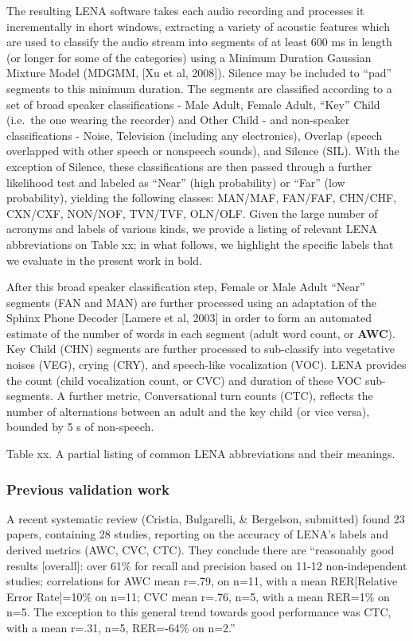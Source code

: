 \documentclass[english,floatsintext,man]{apa6}
\begin{document}
The resulting LENA software takes each audio recording and processes it
incrementally in short windows, extracting a variety of acoustic
features which are used to classify the audio stream into segments of at
least 600 ms in length (or longer for some of the categories) using a
Minimum Duration Gaussian Mixture Model (MDGMM, {[}Xu et al, 2008{]}).
Silence may be included to \enquote{pad} segments to this minimum
duration. The segments are classified according to a set of broad
speaker classifications - Male Adult, Female Adult, \enquote{Key} Child
(i.e.~the one wearing the recorder) and Other Child - and non-speaker
classifications - Noise, Television (including any electronics), Overlap
(speech overlapped with other speech or nonspeech sounds), and Silence
(SIL). With the exception of Silence, these classifications are then
passed through a further likelihood test and labeled as \enquote{Near}
(high probability) or \enquote{Far} (low probability), yielding the
following classes: MAN/MAF, FAN/FAF, CHN/CHF, CXN/CXF, NON/NOF, TVN/TVF,
OLN/OLF. Given the large number of acronyms and labels of various kinds,
we provide a listing of relevant LENA abbreviations on Table xx; in what
follows, we highlight the specific labels that we evaluate in the
present work in bold.

After this broad speaker classification step, Female or Male Adult
\enquote{Near} segments (FAN and MAN) are further processed using an
adaptation of the Sphinx Phone Decoder {[}Lamere et al, 2003{]} in order
to form an automated estimate of the number of words in each segment
(adult word count, or \textbf{AWC}). Key Child (CHN) segments are
further processed to sub-classify into vegetative noises (VEG), crying
(CRY), and speech-like vocalization (VOC). LENA provides the count
(child vocalization count, or CVC) and duration of these VOC
sub-segments. A further metric, Conversational turn counts (CTC),
reflects the number of alternations between an adult and the key child
(or vice versa), bounded by 5 s of non-speech.

Table xx. A partial listing of common LENA abbreviations and their
meanings.

\subsubsection{Previous validation work}\label{previous-validation-work}

A recent systematic review (Cristia, Bulgarelli, \& Bergelson,
submitted) found 23 papers, containing 28 studies, reporting on the
accuracy of LENA's labels and derived metrics (AWC, CVC, CTC). They
conclude there are \enquote{reasonably good results {[}overall{]}: over
61\% for recall and precision based on 11-12 non-independent studies;
correlations for AWC mean r=.79, on n=11, with a mean RER{[}Relative
Error Rate{]}=10\% on n=11; CVC mean r=.76, n=5, with a mean RER=1\% on
n=5. The exception to this general trend towards good performance was
CTC, with a mean r=.31, n=5, RER=-64\% on n=2.}
\end{document}
